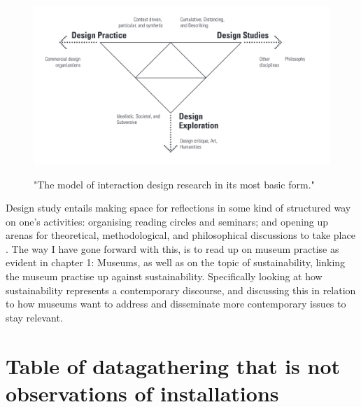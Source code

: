 \begin{figure}[H]
\includegraphics[width=13cm]{pictures/process/triangle.png}
\caption{"The model of interaction design research in its most basic form."}
\autocite[p. 5]{fallman_triangle_2008}
\centering 
\end{figure}



Design study entails making space for reflections in some kind of structured way on one’s activities: organising reading circles and seminars; and opening up arenas for theoretical, methodological, and philosophical discussions to take place \autocite[p. 18]{fallman_triangle_2008}. The way I have gone forward with this, is to read up on museum practise as evident in chapter 1: Museums, as well as on the topic of sustainability, linking the museum practise up against sustainability. Specifically looking at how sustainability represents a contemporary discourse, and discussing this in relation to how museums want to address and disseminate more contemporary issues to stay relevant. 


\section{Table of datagathering that is not observations of installations}

